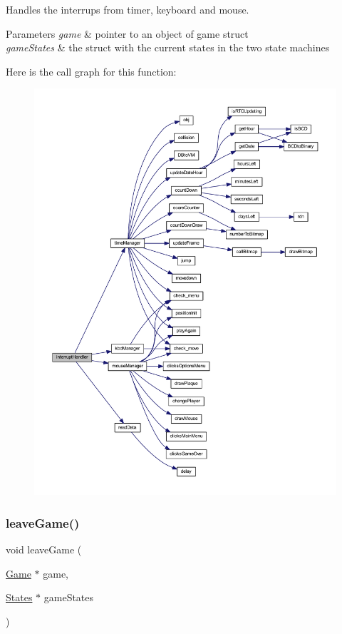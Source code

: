 Handles the interrups from timer, keyboard and mouse. 


\begin{DoxyParams}{Parameters}
{\em game} & pointer to an object of game struct \\
\hline
{\em game\+States} & the struct with the current states in the two state machines \\
\hline
\end{DoxyParams}
Here is the call graph for this function\+:
\nopagebreak
\begin{figure}[H]
\begin{center}
\leavevmode
\includegraphics[width=350pt]{group___game_ga5f4dcc9f4534fe0b6c73f105705434f8_cgraph}
\end{center}
\end{figure}
\mbox{\label{group___game_ga6fcaca11a4e0464324d12d8995454396}} 
\subsubsection{\texorpdfstring{leave\+Game()}{leaveGame()}}
{\footnotesize\ttfamily void leave\+Game (\begin{DoxyParamCaption}\item[{\hyperlink{struct_game}{Game} $\ast$}]{game,  }\item[{\hyperlink{struct_states}{States} $\ast$}]{game\+States }\end{DoxyParamCaption})}




